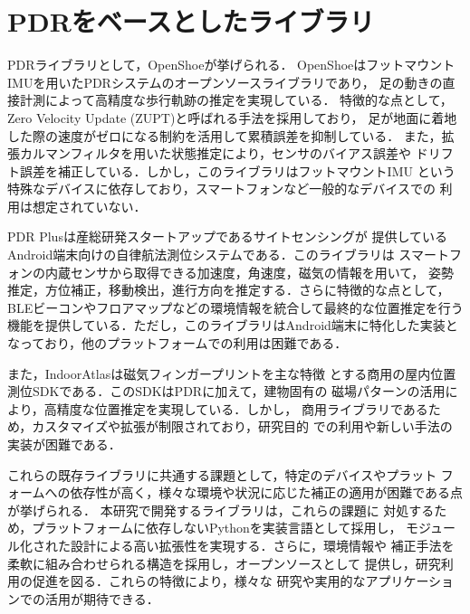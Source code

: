 \section{PDRをベースとしたライブラリ}

PDRライブラリとして，OpenShoe\cite{openshoe}が挙げられる．
OpenShoeはフットマウントIMUを用いたPDRシステムのオープンソースライブラリであり，
足の動きの直接計測によって高精度な歩行軌跡の推定を実現している．
特徴的な点として，Zero Velocity Update (ZUPT)と呼ばれる手法を採用しており，
足が地面に着地した際の速度がゼロになる制約を活用して累積誤差を抑制している．
また，拡張カルマンフィルタを用いた状態推定により，センサのバイアス誤差や
ドリフト誤差を補正している．しかし，このライブラリはフットマウントIMU
という特殊なデバイスに依存しており，スマートフォンなど一般的なデバイスでの
利用は想定されていない．

PDR Plus\cite{pdr-plus}は産総研発スタートアップであるサイトセンシングが
提供しているAndroid端末向けの自律航法測位システムである．このライブラリは
スマートフォンの内蔵センサから取得できる加速度，角速度，磁気の情報を用いて，
姿勢推定，方位補正，移動検出，進行方向を推定する．さらに特徴的な点として，
BLEビーコンやフロアマップなどの環境情報を統合して最終的な位置推定を行う
機能を提供している．ただし，このライブラリはAndroid端末に特化した実装と
なっており，他のプラットフォームでの利用は困難である．

また，IndoorAtlas\cite{indoor-atlas}は磁気フィンガープリントを主な特徴
とする商用の屋内位置測位SDKである．このSDKはPDRに加えて，建物固有の
磁場パターンの活用により，高精度な位置推定を実現している．しかし，
商用ライブラリであるため，カスタマイズや拡張が制限されており，研究目的
での利用や新しい手法の実装が困難である．

これらの既存ライブラリに共通する課題として，特定のデバイスやプラット
フォームへの依存性が高く，様々な環境や状況に応じた補正の適用が困難である点が挙げられる．
本研究で開発するライブラリは，これらの課題に
対処するため，プラットフォームに依存しないPythonを実装言語として採用し，
モジュール化された設計による高い拡張性を実現する．さらに，環境情報や
補正手法を柔軟に組み合わせられる構造を採用し，オープンソースとして
提供し，研究利用の促進を図る．これらの特徴により，様々な
研究や実用的なアプリケーションでの活用が期待できる．




